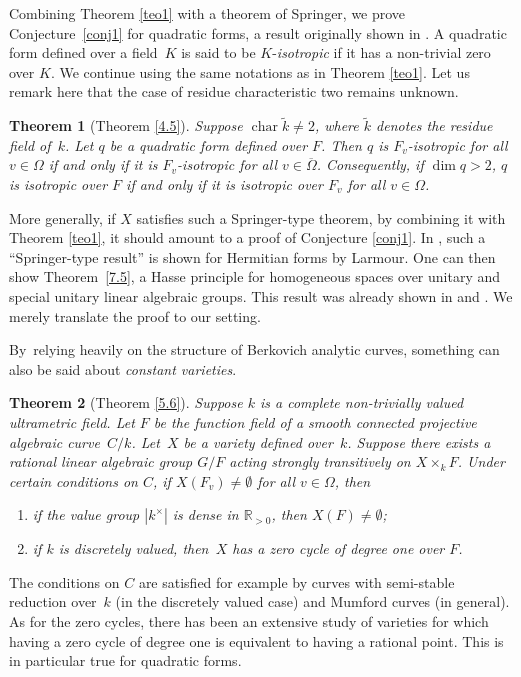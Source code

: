 \documentclass[10pt]{amsart}
\DeclareMathOperator{\Char}{char}
\newtheorem{thm}{Theorem}[section]
\theoremstyle{definition}
\begin{document}
Combining Theorem \ref{teo1} with a theorem of Springer, we prove Conjecture~\ref{conj1} for quadratic forms, a result originally shown in \cite{ctps}. A quadratic form defined over a field~$K$ is said to be $K$-\emph{isotropic} if it has a non-trivial zero over $K$. We continue using the same notations as in Theorem \ref{teo1}. Let us remark here that the case of residue characteristic two remains unknown.
\begin{thm}[Theorem \ref{4.5}]
Suppose $\Char \widetilde{k} \neq 2$, where $\widetilde{k}$ denotes the residue field of~$k$. Let $q$ be a quadratic form defined over $F$. Then $q$ is $F_v$-isotropic for all $v \in \Omega$ if and only if it is $F_v$-isotropic for all $v \in \overline{\Omega}$. Consequently, if $\dim{q}>2$, $q$ is isotropic over $F$ if and only if it is isotropic over $F_v$ for all $v \in \Omega$.
\end{thm}

More generally, if $X$ satisfies such a Springer-type theorem, by combining it with Theorem \ref{teo1}, it should amount to a proof of Conjecture \ref{conj1}. In \cite{larmour}, such a ``Springer-type result'' is shown for Hermitian forms by Larmour. One can then show Theorem~\ref{7.5}, a Hasse principle for homogeneous spaces over unitary and special unitary linear algebraic groups. This result was already shown in \cite{wu} and \cite{parsur}. We merely translate the proof to our setting.

By~relying heavily on the structure of Berkovich analytic curves, something can also be said about \emph{constant varieties}.

\begin{thm}[Theorem \ref{5.6}] Suppose $k$ is a complete non-trivially valued ultrametric field.
Let $F$ be the function field of a smooth connected projective algebraic curve~$C/k$. Let~$X$ be a variety \emph{defined over~$k$}. Suppose there exists a rational linear algebraic group ${G/F}$ acting strongly transitively on ${X \times_k F}$. Under certain conditions on $C$, if ${X(F_v) \neq \emptyset}$ for all $v \in \Omega$, then
\begin{enumerate}
\item if the value group $|k^{\times}|$ is dense in $\mathbb{R}_{>0}$, then $X(F) \neq \emptyset$;
\item if $k$ is discretely valued, then~$X$ has a zero cycle of degree one over $F$.
\end{enumerate}
\end{thm}
The conditions on $C$ are satisfied for example by curves with semi-stable reduction over~$k$ (in the discretely valued case) and Mumford curves (in general).
As for the zero cycles, there has been an extensive study of varieties for which having a zero cycle of degree one is equivalent to having a rational point. This is in particular true for quadratic forms.
\end{document}
